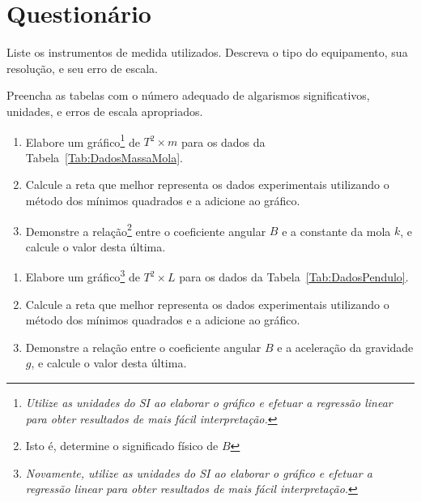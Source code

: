 \vspace{5mm}

\section{Questionário}

\begin{question}[type={exam}]{1}
Liste os instrumentos de medida utilizados. Descreva o tipo do equipamento, sua resolução, e seu erro de escala.
\end{question}

\begin{question}[type={exam}]{2}
Preencha as tabelas com o número adequado de algarismos significativos, unidades, e erros de escala apropriados. 
\end{question}

\begin{question}[type={exam}]{2}
\begin{enumerate}[label=\roman*.]
\item Elabore um gráfico\footnote{\emph{Utilize as unidades do SI ao elaborar o gráfico e efetuar a regressão linear para obter resultados de mais fácil interpretação.}} de $T^2 \times m$ para os dados da Tabela~\ref{Tab:DadosMassaMola}.
\item Calcule a reta que melhor representa os dados experimentais utilizando o método dos mínimos quadrados e a adicione ao gráfico.
\item Demonstre a relação\footnote{Isto é, determine o significado físico de $B$} entre o coeficiente angular $B$ e a constante da mola $k$, e calcule o valor desta última.
\end{enumerate}
\end{question}

\begin{question}[type={exam}]{2}
\begin{enumerate}[label=\roman*.]
\item Elabore um gráfico\footnote{\emph{Novamente, utilize as unidades do SI ao elaborar o gráfico e efetuar a regressão linear para obter resultados de mais fácil interpretação.}} de $T^2 \times L$ para os dados da Tabela~\ref{Tab:DadosPendulo}.
\item Calcule a reta que melhor representa os dados experimentais utilizando o método dos mínimos quadrados e a adicione ao gráfico.
\item Demonstre a relação entre o coeficiente angular $B$ e a aceleração da gravidade $g$, e calcule o valor desta última.
\end{enumerate}
\end{question}


